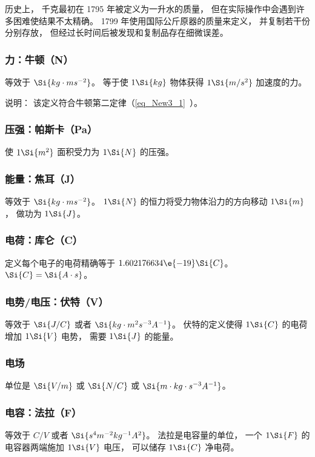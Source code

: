 历史上， 千克最初在 1795 年被定义为一升水的质量， 但在实际操作中会遇到许多困难使结果不太精确。 1799 年使用国际公斤原器的质量来定义， 并复制若干份分别存放， 但经过长时间后被发现和复制品存在细微误差。

\subsubsection{力：牛顿（N）}
等效于 $\Si{kg \cdot m s^{-2}}$。 等于使 $1\Si{kg}$ 物体获得 $1\Si{m/s^2}$ 加速度的力。

说明： 该定义符合牛顿第二定律（\autoref{eq_New3_1}~）。

\subsubsection{压强：帕斯卡（Pa）}
使 $1\Si{m^2}$ 面积受力为 $1\Si{N}$ 的压强。

\subsubsection{能量：焦耳（J）}
等效于 $\Si{kg\cdot ms^{-2}}$。 $1\Si{N}$ 的恒力将受力物体沿力的方向移动 $1\Si{m}$， 做功为 $1\Si{J}$。

\subsubsection{电荷：库仑（C）}
定义每个电子的电荷精确等于 $1.602176634\e{-19} \Si{C}$。 $\Si{C} = \Si{A\cdot s}$。

\subsubsection{电势/电压：伏特（V）}
等效于 $\Si{J/C}$ 或者 $\Si{kg\cdot m^2 s^{-3} A^{-1}}$。 伏特的定义使得 $1\Si{C}$ 的电荷增加 $1\Si{V}$ 电势， 需要 $1\Si{J}$ 的能量。

\subsubsection{电场}
单位是 $\Si{V/m}$ 或 $\Si{N/C}$ 或 $\Si{m\cdot kg \cdot s^{-3} A^{-1}}$。

\subsubsection{电容：法拉（F）}
等效于 $C/V$ 或者 $\Si{s^4 m^{-2} kg^{-1} A^2}$。 法拉是电容量的单位， 一个 $1\Si{F}$ 的电容器两端施加 $1\Si{V}$ 电压， 可以储存 $1\Si{C}$ 净电荷。

